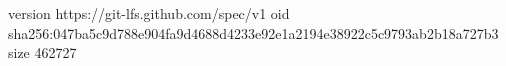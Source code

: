 version https://git-lfs.github.com/spec/v1
oid sha256:047ba5c9d788e904fa9d4688d4233e92e1a2194e38922c5c9793ab2b18a727b3
size 462727
